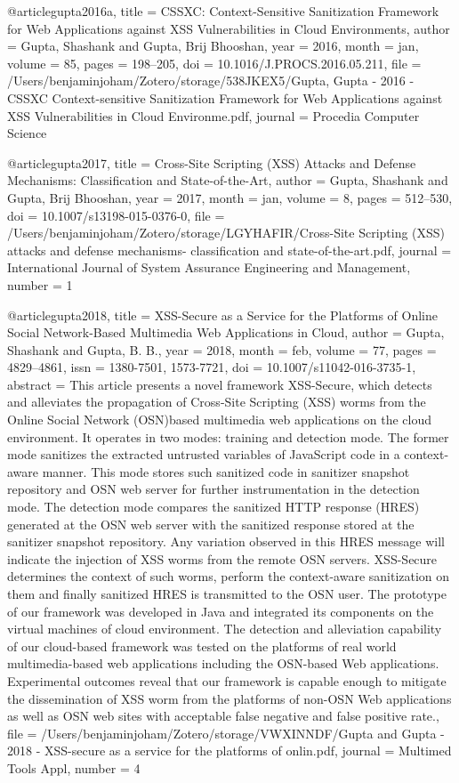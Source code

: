 @article{gupta2016a,
  title = {{{CSSXC}}: {{Context}}-Sensitive {{Sanitization Framework}} for {{Web Applications}} against {{XSS Vulnerabilities}} in {{Cloud Environments}}},
  author = {Gupta, Shashank and Gupta, Brij Bhooshan},
  year = {2016},
  month = jan,
  volume = {85},
  pages = {198--205},
  doi = {10.1016/J.PROCS.2016.05.211},
  file = {/Users/benjaminjoham/Zotero/storage/538JKEX5/Gupta, Gupta - 2016 - CSSXC Context-sensitive Sanitization Framework for Web Applications against XSS Vulnerabilities in Cloud Environme.pdf},
  journal = {Procedia Computer Science}
}

@article{gupta2017,
  title = {Cross-{{Site Scripting}} ({{XSS}}) Attacks and Defense Mechanisms: Classification and State-of-the-Art},
  author = {Gupta, Shashank and Gupta, Brij Bhooshan},
  year = {2017},
  month = jan,
  volume = {8},
  pages = {512--530},
  doi = {10.1007/s13198-015-0376-0},
  file = {/Users/benjaminjoham/Zotero/storage/LGYHAFIR/Cross-Site Scripting (XSS) attacks and defense mechanisms- classification and state-of-the-art.pdf},
  journal = {International Journal of System Assurance Engineering and Management},
  number = {1}
}

@article{gupta2018,
  title = {{{XSS}}-Secure as a Service for the Platforms of Online Social Network-Based Multimedia Web Applications in Cloud},
  author = {Gupta, Shashank and Gupta, B. B.},
  year = {2018},
  month = feb,
  volume = {77},
  pages = {4829--4861},
  issn = {1380-7501, 1573-7721},
  doi = {10.1007/s11042-016-3735-1},
  abstract = {This article presents a novel framework XSS-Secure, which detects and alleviates the propagation of Cross-Site Scripting (XSS) worms from the Online Social Network (OSN)based multimedia web applications on the cloud environment. It operates in two modes: training and detection mode. The former mode sanitizes the extracted untrusted variables of JavaScript code in a context-aware manner. This mode stores such sanitized code in sanitizer snapshot repository and OSN web server for further instrumentation in the detection mode. The detection mode compares the sanitized HTTP response (HRES) generated at the OSN web server with the sanitized response stored at the sanitizer snapshot repository. Any variation observed in this HRES message will indicate the injection of XSS worms from the remote OSN servers. XSS-Secure determines the context of such worms, perform the context-aware sanitization on them and finally sanitized HRES is transmitted to the OSN user. The prototype of our framework was developed in Java and integrated its components on the virtual machines of cloud environment. The detection and alleviation capability of our cloud-based framework was tested on the platforms of real world multimedia-based web applications including the OSN-based Web applications. Experimental outcomes reveal that our framework is capable enough to mitigate the dissemination of XSS worm from the platforms of non-OSN Web applications as well as OSN web sites with acceptable false negative and false positive rate.},
  file = {/Users/benjaminjoham/Zotero/storage/VWXINNDF/Gupta and Gupta - 2018 - XSS-secure as a service for the platforms of onlin.pdf},
  journal = {Multimed Tools Appl},
  number = {4}
}

